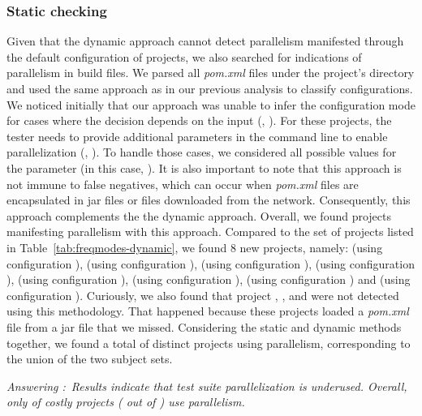 \documentclass[10pt,journal,compsoc]{IEEEtran}
\begin{document}
\subsubsection{Static checking}
\label{sec:rqC-2}
Given that the dynamic approach cannot detect parallelism manifested
through the default
configuration of projects, we also searched for indications of parallelism in build
files.  We
parsed all \emph{pom.xml} files under the project's directory and used
the same approach as in our previous analysis to classify
configurations.  We noticed initially that our approach was unable to
infer the configuration mode for cases where the decision depends on
the input (\eg,
). For these
projects, the tester needs to provide additional parameters in the
command line to enable parallelization (\eg, ). To handle those cases, we
considered all possible values for the parameter (in this case,
).  It is also important to note that this
approach is not immune to false negatives, which can occur when
\emph{pom.xml} files are encapsulated in jar files or files downloaded from
the network.  Consequently, this approach complements the
the dynamic approach. Overall, we found \numProjectsParStatic{}
projects manifesting parallelism with this approach.
Compared to the set of projects listed in
Table~\ref{tab:freqmodes-dynamic}, we found 8 new projects, namely:
 (using
configuration \ForkSeq),  (using configuration
\ForkSeq{}),  (using configuration \ForkSeq),  (using configuration \ForkSeq),  (using configuration \ForkSeq),  (using configuration \ForkSeq),  (using configuration \SeqClassParMeth)   and
 (using configuration \ForkSeq).
Curiously, we also found that project , ,
and  were not detected using this methodology.
That happened because these projects loaded a \emph{pom.xml} file from
a jar file that we missed.
Considering the static and dynamic methods together, we found a total
of \numProjectsParTotal{} distinct projects using parallelism,
corresponding to the union of the two subject sets.

\begin{mdframed}
  \noindent\textit{Answering \numRQAdoptionOne{}:}~\emph{Results indicate that test
  suite parallelization is underused.  Overall, only
  \percentParallel{} of costly projects (\numProjectsParTotal{} out of \numMedLong)
  use parallelism.}
\end{mdframed}
\end{document}
